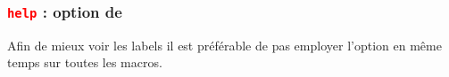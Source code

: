 \subsubsection{\texttt{\textcolor{red}{help}} :  option de }
Afin de mieux voir les labels il est préférable de pas employer l'option  en même temps sur toutes les macros.
%
%
%
%
